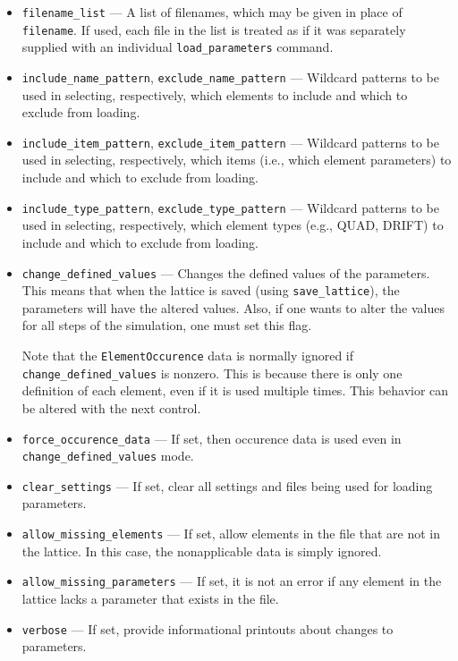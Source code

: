 \documentclass[11pt]{article}
\begin{document}
\begin{itemize}
\item \verb|filename_list| --- A list of filenames, which may be 
        given in place of \verb|filename|.  If used, each file
        in the list is treated as if it was separately supplied
        with an individual \verb|load_parameters| command.

\item \verb|include_name_pattern|, \verb|exclude_name_pattern| ---
Wildcard patterns to be used in selecting, respectively, which
elements to include and which to exclude from loading.

\item \verb|include_item_pattern|, \verb|exclude_item_pattern| ---
Wildcard patterns to be used in selecting, respectively, which items
(i.e., which element parameters) to include and which to exclude from
loading.

\item \verb|include_type_pattern|, \verb|exclude_type_pattern| ---
Wildcard patterns to be used in selecting, respectively, which element
types (e.g., QUAD, DRIFT) to include and which to exclude from
loading.

\item \verb|change_defined_values| --- Changes the defined values of
the parameters.  This means that when the lattice is saved (using
\verb|save_lattice|), the parameters will have the altered values.
Also, if one wants to alter the values for all steps of the simulation,
one must set this flag. 

Note that the \verb|ElementOccurence| data is normally ignored if
\verb|change_defined_values| is nonzero.  This is because there is
only one definition of each element, even if it is used multiple times.
This behavior can be altered with the next control.

\item \verb|force_occurence_data| --- If set, then occurence data is
used even in \verb|change_defined_values| mode.

\item \verb|clear_settings| --- If set, clear all settings and files
being used for loading parameters.

\item \verb|allow_missing_elements| --- If set, allow elements in the
file that are not in the lattice.  In this case, the nonapplicable
data is simply ignored.

\item \verb|allow_missing_parameters| --- If set, it is not an error
if any element in the lattice lacks a parameter that exists in the file.

\item \verb|verbose| --- If set, provide informational printouts about
changes to parameters.

\end{itemize}
\end{document}
